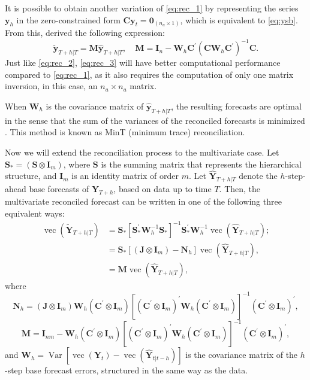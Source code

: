 \documentclass[a4paper,preprint,11pt,authoryear]{elsarticle}
\DeclareMathOperator{\Var}{Var}
\DeclareMathOperator{\vetor}{vec}
\begin{document}
It is possible to obtain another variation of \eqref{eq:rec_1} by representing the series $\bm{y}_h$ in the zero-constrained form $\bm{C}\bm{y}_t = \bm{0}_{(n_a \times 1)}$, which is equivalent to \eqref{eq:ysb}. From this, \citet{di2023cross} derived the following expression:
\begin{equation}
  \widetilde{\bm{y}}_{T+h|T} = \bm{M}\widehat{\bm{y}}_{T+h|T}, \quad \bm{M} = \bm{I}_n - \bm{W}_h\bm{C}^\prime(\bm{C}\bm{W}_h\bm{C}^\prime)^{-1}\bm{C}.
  \label{eq:rec_3}
\end{equation}
Just like \eqref{eq:rec_2}, \eqref{eq:rec_3} will have better computational performance compared to \eqref{eq:rec_1}, as it also requires the computation of only one matrix inversion, in this case, an $n_a \times n_a$ matrix.

When $\bm{W}_h$ is the covariance matrix of $\widehat{\bm{y}}_{T+h|T}$, the resulting forecasts are optimal in the sense that the sum of the variances of the reconciled forecasts is minimized \citep{wickramasuriya2019optimal}. This method is known as MinT (minimum trace) reconciliation.

Now we will extend the reconciliation process to the multivariate case. Let $\bm{S}_* = (\bm{S} \otimes \bm{I}_m)$, where $\bm{S}$ is the summing matrix that represents the hierarchical structure, and $\bm{I}_m$ is an identity matrix of order $m$. Let $\widehat{\bm{Y}}_{T+h|T}$ denote the $h$-step-ahead base forecasts of $\bm{Y}_{T+h}$, based on data up to time $T$. Then, the multivariate reconciled forecast can be written in one of the following three equivalent ways:
\begin{align}
  \vetor(\widetilde{\bm{Y}}_{T+h|T}) &= \bm{S}_* [\bm{S}_*^\prime \bm{W}_h^{-1} \bm{S}_*]^{-1} \bm{S}_*^\prime \bm{W}_h^{-1} \vetor(\widehat{\bm{Y}}_{T+h|T});
  \label{eq:rec_MV} \\
  &= \bm{S}_* [(\bm{J}\otimes \bm{I}_m) - \bm{N}_h] \vetor(\widehat{\bm{Y}}_{T+h|T}),
  \label{eq:rec_MV2} \\
  & = \bm{M} \vetor(\widehat{\bm{Y}}_{T+h|T}),
  \label{eq:rec_MV3}
\end{align}
where
$$
\bm{N}_h = (\bm{J}\otimes \bm{I}_m)\bm{W}_h(\bm{C}^\prime\otimes \bm{I}_m)[(\bm{C}^\prime\otimes \bm{I}_m)^\prime\bm{W}_h(\bm{C}^\prime\otimes \bm{I}_m)]^{-1}(\bm{C}^\prime\otimes \bm{I}_m)^\prime,
$$
$$
\bm{M} = \bm{I}_{nm} - \bm{W}_h(\bm{C}^\prime\otimes\bm{I}_m)[(\bm{C}^\prime\otimes\bm{I}_m)^\prime\bm{W}_h(\bm{C}^\prime\otimes\bm{I}_m)]^{-1}(\bm{C}^\prime\otimes\bm{I}_m)^\prime,
$$
and $\bm{W}_h = \Var[\vetor(\bm{Y}_t) - \vetor(\widehat{\bm{Y}}_{t|t-h})]$ is the covariance matrix of the $h$-step base forecast errors, structured in the same way as the data.
\end{document}
